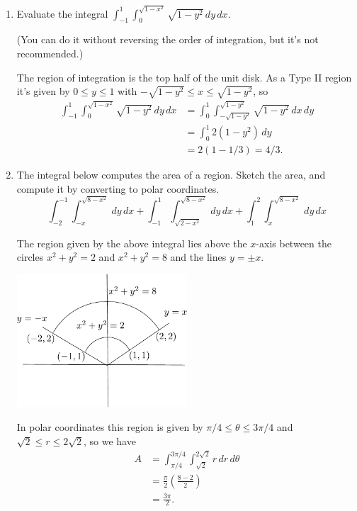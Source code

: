\documentclass[12pt]{article}
\newcommand{\points}[1]{\marginpar{\hspace{24pt}[#1]}}
\newcommand{\di}{\displaystyle}
\begin{document}
\begin{enumerate}
\item Evaluate the integral $\di \int_{-1}^1\int_0^{\sqrt{1-x^2}}\sqrt{1-y^2}\,dy\,dx$. \points{6}

(You can do it without reversing the order of integration, but it's not recommended.)


\bigskip

The region of integration is the top half of the unit disk. As a Type II region it's given by $0\leq y\leq 1$ with $-\sqrt{1-y^2}\leq x\leq \sqrt{1-y^2}$, so
\begin{align*}
 \int_{-1}^1\int_0^{\sqrt{1-x^2}}\sqrt{1-y^2}\,dy\,dx & = \int_0^1\int_{-\sqrt{1-y^2}}^{\sqrt{1-y^2}}\sqrt{1-y^2}\,dx\,dy\\
& = \int_0^1 2(1-y^2)\,dy\\
& = 2(1-1/3) = 4/3.
\end{align*}

\bigskip


\item The integral below computes the area of a region. Sketch the area, and compute it by converting to polar coordinates. \points{6}
\[
\int_{-2}^{-1}\int_{-x}^{\sqrt{8-x^2}}\,dy\,dx+\int_{-1}^1\int_{\sqrt{2-x^2}}^{\sqrt{8-x^2}}\,dy\,dx + \int_1^2\int_x^{\sqrt{8-x^2}}\,dy\,dx
\]

\bigskip

The region given by the above integral lies above the $x$-axis between the circles $x^2+y^2=2$ and $x^2+y^2=8$ and the lines $y=\pm x$. 
\begin{multicols}{2}
 \begin{center}
  \includegraphics[width=2.5in]{T3_2a.pdf}
 \end{center}
\columnbreak
 
In polar coordinates this region is given by $\pi/4\leq \theta\leq 3\pi/4$ and $\sqrt{2}\leq r\leq 2\sqrt{2}$, so we have
\begin{align*}
 A & = \int_{\pi/4}^{3\pi/4}\int_{\sqrt{2}}^{2\sqrt{2}}r\,dr\,d\theta\\
& = \frac{\pi}{2}\left(\frac{8-2}{2}\right)\\
& = \frac{3\pi}{2}.
\end{align*}


\end{multicols}
\end{enumerate}
\end{document}
